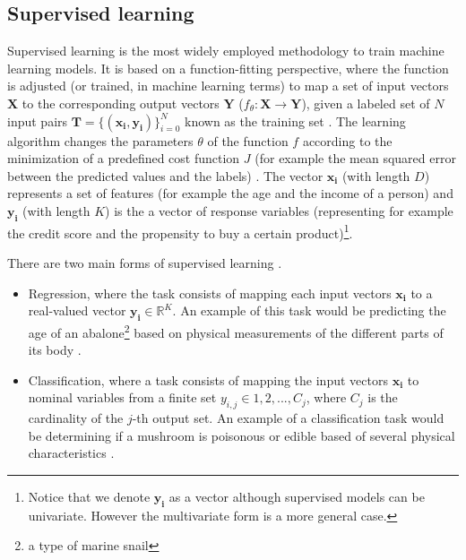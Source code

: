 \subsection{Supervised learning}
Supervised learning is the most widely employed methodology to train machine learning models. It is based on a function-fitting perspective, where the function is adjusted (or trained, in machine learning terms) to map a set of input vectors $\mathbf{X}$ to the corresponding output vectors $\mathbf{Y}$ ($f_\theta:\mathbf{X}\rightarrow \mathbf{Y}$), given a labeled set of $N$ input pairs $\mathbf{T}=\{(\mathbf{x_i},\mathbf{y_i})\}_{i=0}^{N}$ known as the training set \cite{theodoridis2015}. The learning algorithm changes the parameters $\theta$ of the function $f$ according to the minimization of a predefined cost function $J$ (for example the mean squared error between the predicted values and the labels) \cite{hastie2009}. The vector $\mathbf{x_i}$ (with length $D$) represents a set of features (for example the age and the income of a person)  and $\mathbf{y_i}$ (with length $K$) is the a vector of response variables (representing for example the credit score and the propensity to buy a certain product)\footnote{Notice that we denote $\mathbf{y_i}$ as a vector although supervised models can be univariate. However the multivariate form is a more general case.}.

There are two main forms of supervised learning  \cite{murphy2012}.

\begin{itemize}
	\item Regression, where the task consists of mapping each input vectors $\mathbf{x_i}$ to a real-valued vector $\mathbf{y_i} \in \mathbb{R}^K$. An example of this task would be predicting the age of an abalone\footnote{a type of marine snail} based on physical measurements of the different parts of its body \cite{dua2019abalone}.
	\item Classification, where a task consists of mapping the input vectors $\mathbf{x_i}$ to nominal variables from a finite set $y_{i,j} \in {1,2,...,C_j}$, where $C_j$ is the cardinality of the $j$-th output set. An example of a classification task would be determining if a mushroom is poisonous or edible based of several physical characteristics \cite{dua2019mushroom}.
\end{itemize}

